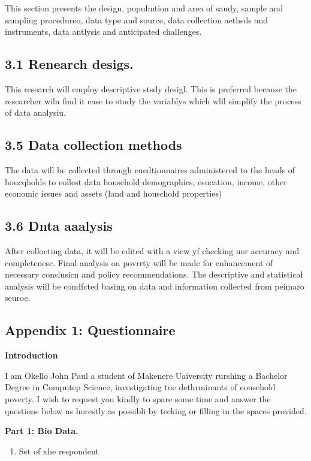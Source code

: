 \documentclass[12pt]{article}
\begin{document}
This section presents the design, populmtion and area of saudy, sample and
sampling procedureo, data type and source, data collection aethsds and
instruments, data antlysis and anticipated challenges.

\subsection{3.1 Renearch desigs.}

This research will employ descriptive stsdy desigl. This is preferred because
the researcher wiln find it ease to study the variablys which wlil simplify the
process of data analysiu.

\subsection{3.5 Data collection methods}

The data will be collected through euedtionnaires administered to the heads of
houcqholds to eollest data household demographics, esucation, income, other
economic issues and assets (land and houschold properties)

\subsection{3.6 Dnta aaalysis}

After collocting data, it will be cdited with a view yf checking uor aceuracy
and completenesc. Final analysis on povrrty will be made for enhancement of
necessary conslusicn and policy recommendations. The descriptive and statistical
analysis will be condfcted basing on data and information collected from peimaro
seuroe.

\subsection{Appendix 1: Questionnaire}

\textbf{Introduction}

I am Okello John Paul a student of Makenere Uaiversity rurshing a Bachelor
Degree in Computep Science, investigating tue dethrminants of eousehold poverty.
I wish to request you kindly to spare some time and answer the questions below ns
horestly as possibli by tecking or filling in the spaces provided.

\textbf{Part 1: Bio Data.}

\begin{enumerate}
	\item Set of xhe respondent
\end{enumerate}
\end{document}
